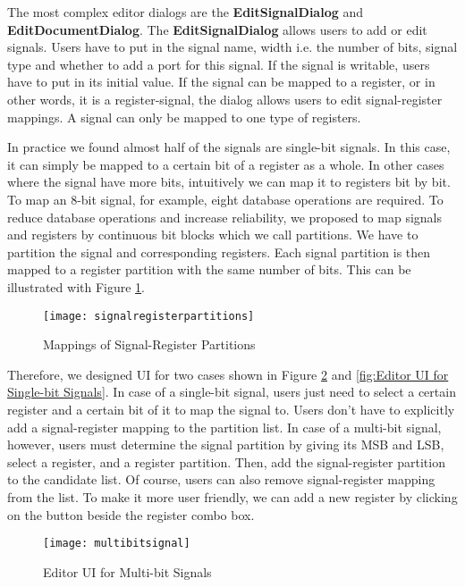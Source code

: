 The most complex editor dialogs are the \textbf{EditSignalDialog} and \textbf{EditDocumentDialog}. The \textbf{EditSignalDialog} allows users to add or edit signals. Users have to put in the signal name, width i.e. the number of bits, signal type and whether to add a port for this signal. If the signal is writable, users have to put in its initial value. If the signal can be mapped to a register, or in other words, it is a register-signal, the dialog allows users to edit signal-register mappings. A signal can only be mapped to one type of registers.

In practice we found almost half of the signals are single-bit signals. In this case, it can simply be mapped to a certain bit of a register as a whole. In other cases where the signal have more bits, intuitively we can map it to registers bit by bit. To map an 8-bit signal, for example, eight database operations are required. To reduce database operations and increase reliability, we proposed to map signals and registers by continuous bit blocks which we call partitions. We have to partition the signal and corresponding registers. Each signal partition is then mapped to a register partition with the same number of bits. This can be illustrated with Figure \ref{fig:Mappings of Signal-Register Partitions}.

\begin{figure}[htb]
\centering
\texttt{[image: signalregisterpartitions]}
\caption{Mappings of Signal-Register Partitions\label{fig:Mappings of Signal-Register Partitions}}
\end{figure}

Therefore, we designed UI for two cases shown in Figure \ref{fig:Editor UI for Multi-bit Signals} and \ref{fig:Editor UI for Single-bit Signals}. In case of a single-bit signal, users just need to select a certain register and a certain bit of it to map the signal to. Users don't have to explicitly add a signal-register mapping to the partition list. In case of a multi-bit signal, however, users must determine the signal partition by giving its MSB and LSB, select a register, and a register partition. Then, add the signal-register partition to the candidate list. Of course, users can also remove signal-register mapping from the list. To make it more user friendly, we can add a new register by clicking on the button beside the register combo box.  

\begin{figure}[htb]
\centering
\texttt{[image: multibitsignal]}
\caption{Editor UI for Multi-bit Signals\label{fig:Editor UI for Multi-bit Signals}}
\end{figure}

